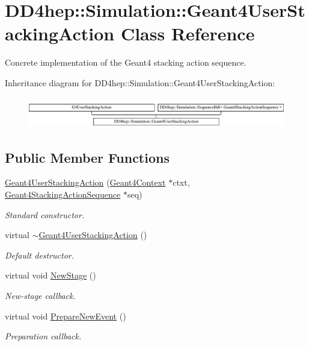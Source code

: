 \hypertarget{class_d_d4hep_1_1_simulation_1_1_geant4_user_stacking_action}{}\section{D\+D4hep\+:\+:Simulation\+:\+:Geant4\+User\+Stacking\+Action Class Reference}
\label{class_d_d4hep_1_1_simulation_1_1_geant4_user_stacking_action}


Concrete implementation of the Geant4 stacking action sequence.  


Inheritance diagram for D\+D4hep\+:\+:Simulation\+:\+:Geant4\+User\+Stacking\+Action\+:\begin{figure}[H]
\begin{center}
\leavevmode
\includegraphics[height=1.352657cm]{class_d_d4hep_1_1_simulation_1_1_geant4_user_stacking_action}
\end{center}
\end{figure}
\subsection*{Public Member Functions}
\begin{DoxyCompactItemize}
\item 
\hyperlink{class_d_d4hep_1_1_simulation_1_1_geant4_user_stacking_action_a34c062c0fa5934878f532ef10f9c96d5}{Geant4\+User\+Stacking\+Action} (\hyperlink{class_d_d4hep_1_1_simulation_1_1_geant4_context}{Geant4\+Context} $\ast$ctxt, \hyperlink{class_d_d4hep_1_1_simulation_1_1_geant4_stacking_action_sequence}{Geant4\+Stacking\+Action\+Sequence} $\ast$seq)
\begin{DoxyCompactList}\small\item\em Standard constructor. \end{DoxyCompactList}\item 
virtual \hyperlink{class_d_d4hep_1_1_simulation_1_1_geant4_user_stacking_action_a023f102d73420bfab08e6a866ea03dc7}{$\sim$\+Geant4\+User\+Stacking\+Action} ()
\begin{DoxyCompactList}\small\item\em Default destructor. \end{DoxyCompactList}\item 
virtual void \hyperlink{class_d_d4hep_1_1_simulation_1_1_geant4_user_stacking_action_ae8abf4d3f1981b66637e9ceffbc9c604}{New\+Stage} ()
\begin{DoxyCompactList}\small\item\em New-\/stage callback. \end{DoxyCompactList}\item 
virtual void \hyperlink{class_d_d4hep_1_1_simulation_1_1_geant4_user_stacking_action_a565c100df77dc0bdfe343a424285cdab}{Prepare\+New\+Event} ()
\begin{DoxyCompactList}\small\item\em Preparation callback. \end{DoxyCompactList}\end{DoxyCompactItemize}
